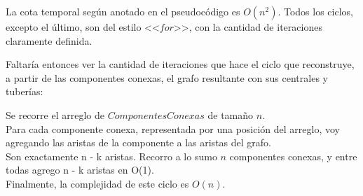 \documentclass[11pt, a4paper, twoside]{article}
\begin{document}
{}

La cota temporal según anotado en el pseudocódigo es $O(n^2)$. Todos los ciclos,
excepto el último, son del estilo <<$for$>>, con la cantidad de iteraciones
claramente definida.

Faltaría entonces ver la cantidad de iteraciones que hace el ciclo que
reconstruye, a partir de las componentes conexas, el grafo resultante con sus
centrales y tuberías:

\hspace{0.03\linewidth}
\parbox{0.89\linewidth}{
  Se recorre el arreglo de $ComponentesConexas$ de tamaño $n$. \\

  Para cada componente conexa, representada por una posición del arreglo, voy
  agregando las aristas de la componente a las aristas del grafo. \\

  Son exactamente n - k aristas. Recorro a lo sumo $n$ componentes conexas, y
  entre todas agrego n - k aristas en O(1). \\

  Finalmente, la complejidad de este ciclo es $O(n)$. \\
}
\end{document}
